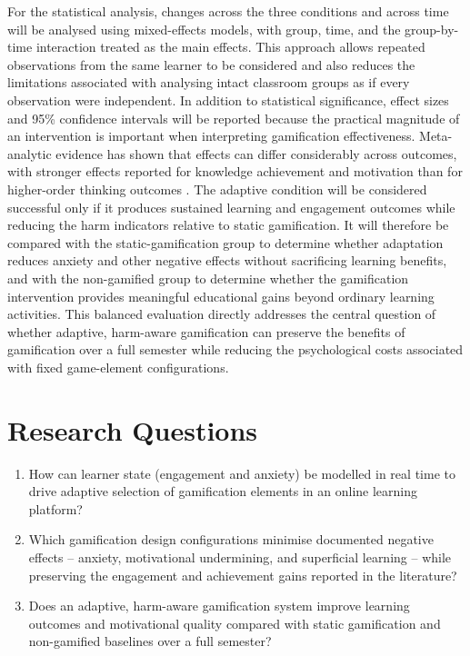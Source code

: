 \documentclass[12pt,a4paper]{article}
\begin{document}
\begin{justify}
For the statistical analysis, changes across the three conditions and across time will be analysed using mixed-effects models, with group, time, and the group-by-time interaction treated as the main effects. This approach allows repeated observations from the same learner to be considered and also reduces the limitations associated with analysing intact classroom groups as if every observation were independent. In addition to statistical significance, effect sizes and 95\% confidence intervals will be reported because the practical magnitude of an intervention is important when interpreting gamification effectiveness. Meta-analytic evidence has shown that effects can differ considerably across outcomes, with stronger effects reported for knowledge achievement and motivation than for higher-order thinking outcomes \parencite{lu2024ai}.
The adaptive condition will be considered successful only if it produces sustained learning and engagement outcomes while reducing the harm indicators relative to static gamification. It will therefore be compared with the static-gamification group to determine whether adaptation reduces anxiety and other negative effects without sacrificing learning benefits, and with the non-gamified group to determine whether the gamification intervention provides meaningful educational gains beyond ordinary learning activities. This balanced evaluation directly addresses the central question of whether adaptive, harm-aware gamification can preserve the benefits of gamification over a full semester while reducing the psychological costs associated with fixed game-element configurations.



\section{Research Questions}

\vspace{0.2cm}

\begin{enumerate}
    \item \label{rq:rq1} How can learner state (engagement and anxiety) be modelled in real time to drive adaptive selection of gamification elements in an online learning platform?
    \item \label{rq:rq2} Which gamification design configurations minimise documented negative effects -- anxiety, motivational undermining, and superficial learning -- while preserving the engagement and achievement gains reported in the literature?
    \item \label{rq:rq3} Does an adaptive, harm-aware gamification system improve learning outcomes and motivational quality compared with static gamification and non-gamified baselines over a full semester?
\end{enumerate}



\end{justify}
\end{document}
